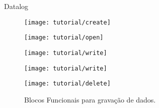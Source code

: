 \begin{frame}{Datalog}
   \begin{figure}[ht]
       \begin{minipage}[b]{0.3\linewidth}
         \centering
 \texttt{[image: tutorial/create]}
       \end{minipage}
       \begin{minipage}[b]{0.3\linewidth}
         \centering
 \texttt{[image: tutorial/open]}
\end{minipage}
       \begin{minipage}[b]{0.3\linewidth}
         \centering
	\texttt{[image: tutorial/write]}
       \end{minipage}
       \hspace{0.5cm}
       \begin{minipage}[b]{0.3\linewidth}
           \centering
	\texttt{[image: tutorial/write]}
       \end{minipage}
       \begin{minipage}[b]{0.3\linewidth}
           \centering
           \texttt{[image: tutorial/delete]}
       \end{minipage}
  \caption{Blocos Funcionais para gravação de dados.}
   \end{figure}
\end{frame}


